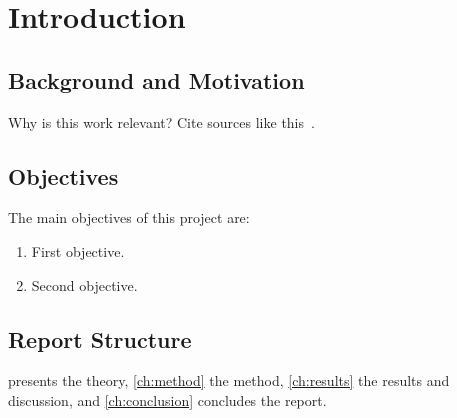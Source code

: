 \chapter{Introduction}
\label{ch:introduction}

\section{Background and Motivation}
Why is this work relevant? Cite sources like this~\cite{knuth1984}.

\section{Objectives}
The main objectives of this project are:
\begin{enumerate}
  \item First objective.
  \item Second objective.
\end{enumerate}

\section{Report Structure}
 presents the theory, \cref{ch:method} the method,
\cref{ch:results} the results and discussion, and \cref{ch:conclusion}
concludes the report.
